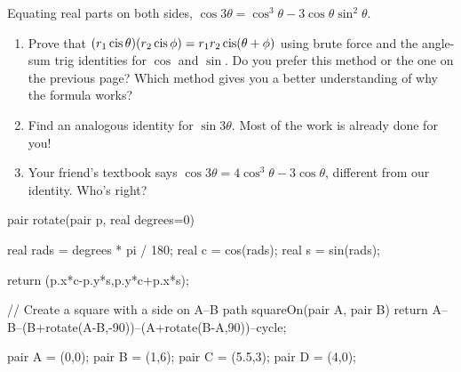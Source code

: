 \documentclass[../textbook.tex]{subfiles}
\begin{document}
\noindent Equating real parts on both sides, $\cos 3\theta = \cos^3\theta - 3\cos\theta\sin^2\theta$.

\begin{enumerate}
\setcounter{enumi}{\value{problem_i}}
\item Prove that $(r_1\operatorname{cis} \theta)(r_2\operatorname{cis} \phi) = r_1r_2 \operatorname{cis}(\theta + \phi)$ using brute force and the angle-sum trig identities for $\cos$ and $\sin$. Do you prefer this method or the one on the previous page? Which method gives you a better understanding of why the formula works?
\item Find an analogous identity for $\sin 3\theta$. Most of the work is already done for you!
\item Your friend's textbook says $\cos 3\theta = 4\cos^3\theta - 3\cos \theta$, different from our identity. Who's right?

\setcounter{problem_i}{\value{enumi}}
\end{enumerate}

\begin{asydef}
pair rotate(pair p, real degrees=0) {
	real rads = degrees * pi / 180;
	real c = cos(rads);
	real s = sin(rads);

	return (p.x*c-p.y*s,p.y*c+p.x*s);
}

// Create a square with a side on A--B
path squareOn(pair A, pair B) {
	return A--B--(B+rotate(A-B,-90))--(A+rotate(B-A,90))--cycle;
}

pair A = (0,0);
pair B = (1,6);
pair C = (5.5,3);
pair D = (4,0);
\end{asydef}
\end{document}
